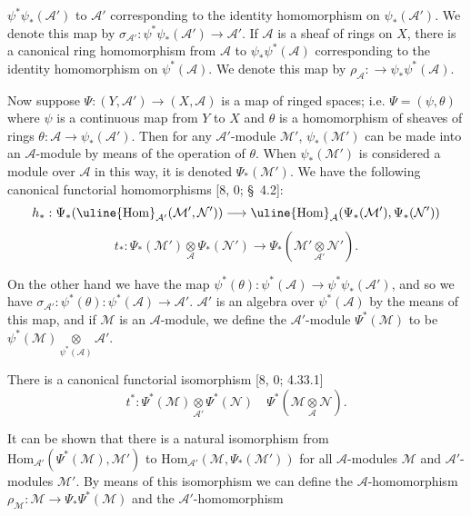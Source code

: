 
$\psi^*\psi_*(\mathcal A')$ to $\mathcal A'$ corresponding to the identity homomorphism on $\psi_*(\mathcal A')$. We denote this map by $\sigma_{\mathcal A'}:\psi^*\psi_*(\mathcal A')\to\mathcal A'$. If $\mathcal A$ is a sheaf of rings on $X$, there is a canonical ring homomorphism from $\mathcal A$ to $\psi_*\psi^*(\mathcal A)$ corresponding to the identity homomorphism on $\psi^*(\mathcal A)$. We denote this map by $\rho_{\mathcal A}:\to\psi_*\psi^*(\mathcal A)$.

Now suppose $\Psi:(Y,\mathcal A')\to(X,\mathcal A)$ is a map of ringed spaces; i.e. $\Psi=(\psi,\theta)$ where $\psi$ is a continuous map from $Y$ to $X$ and $\theta$ is a homomorphism of sheaves of rings $\theta:\mathcal A\to\psi_*(\mathcal A')$. Then for any $\mathcal A'$-module $\mathcal M'$, $\psi_*(\mathcal M')$ can be made into an $\mathcal A$-module by means of the operation of $\theta$. When $\psi_*(\mathcal M')$ is considered a module over $\mathcal A$ in this way, it is denoted $\Psi_*(\mathcal M')$. We have the following canonical functorial homomorphisms [8, 0; \S\ 4.2]:
\[
h_*:\Psi_*(\uline{\mathrm{Hom}}_{\mathcal A'}(\mathcal M',\mathcal N'))\longrightarrow\uline{\mathrm{Hom}}_{\mathcal A}(\Psi_*(\mathcal M'),\Psi_*(\mathcal N'))
\]
\[
t_*:\Psi_*(\mathcal M')\underset{\mathcal A}{\otimes}\Psi_*(\mathcal N')\longrightarrow\Psi_*(\mathcal M'\underset{\mathcal A'}{\otimes}\mathcal N').
\]

On the other hand we have the map $\psi^*(\theta):\psi^*(\mathcal A)\to\psi^*\psi_*(\mathcal A')$, and so we have $\sigma_{\mathcal A'}:\psi^*(\theta):\psi^*(\mathcal A)\to\mathcal A'$. $\mathcal A'$ is an algebra over $\psi^*(\mathcal A)$ by the means of this map, and if $\mathcal M$ is an $\mathcal A$-module, we define the $\mathcal A'$-module $\Psi^*(\mathcal M)$ to be $\psi^*(\mathcal M)\underset{\psi^*(\mathcal A)}{\otimes}\mathcal A'$.

There is a canonical functorial isomorphism [8, 0; 4.33.1]
\[
t^*:\Psi^*(\mathcal M)\underset{\mathcal A'}{\otimes}\Psi^*(\mathcal N)\quad\Psi^*(\mathcal M\underset{\mathcal A}{\otimes}\mathcal N).
\]

It can be shown that there is a natural isomorphism from $\mathrm{Hom}_{\mathcal A'}(\Psi^*(\mathcal M),\mathcal M')$ to $\mathrm{Hom}_{\mathcal A'}(\mathcal M,\Psi_*(\mathcal M'))$ for all $\mathcal A$-modules $\mathcal M$ and $\mathcal A'$-modules $\mathcal M'$. By means of this isomorphism we can define the $\mathcal A$-homomorphism $\rho_{\mathcal M}:\mathcal M\to\Psi_*\Psi^*(\mathcal M)$ and the $\mathcal A'$-homomorphism

